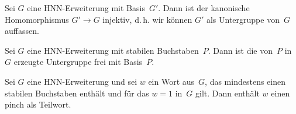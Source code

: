 \begin{thProposition}
    \label{ch0:hnnembedding}
    Sei $G$ eine HNN-Erweiterung mit Basis~$G'$. Dann ist der kanonische
    Homomorphismus $G'\to G$ injektiv, d.\,h. wir können $G'$ als
    Untergruppe von~$G$ auffassen.
\end{thProposition}

\begin{thProposition}
    \label{ch0:hnnstablesfree}
    Sei $G$ eine HNN-Erweiterung mit stabilen Buchstaben~$P$. Dann ist
    die von~$P$ in~$G$ erzeugte Untergruppe frei mit Basis~$P$.
\end{thProposition}

\begin{thLemma}
    \label{ch0:brittonslemma}
    Sei $G$ eine HNN-Erweiterung und sei $w$ ein Wort aus~$G$,
    das mindestens einen stabilen Buchstaben enthält und für
    das $w=1$ in~$G$ gilt. Dann enthält $w$ einen pinch als Teilwort.
\end{thLemma}
